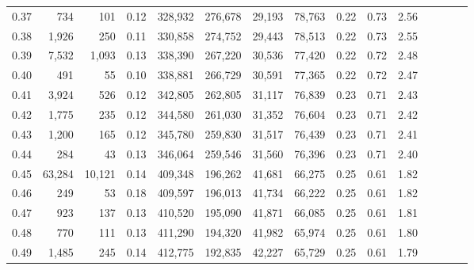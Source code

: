 \begin{tabular}{rrrcrrrrrrrrrrr}
0.37 &     734 &     101 &                                       0.12 &  328,932 &  276,678 &   29,193 &   78,763 &  0.22 &  0.73 &                         2.56 \\
0.38 &   1,926 &     250 &                                       0.11 &  330,858 &  274,752 &   29,443 &   78,513 &  0.22 &  0.73 &                         2.55 \\
0.39 &   7,532 &   1,093 &                                       0.13 &  338,390 &  267,220 &   30,536 &   77,420 &  0.22 &  0.72 &                         2.48 \\
0.40 &     491 &      55 &                                       0.10 &  338,881 &  266,729 &   30,591 &   77,365 &  0.22 &  0.72 &                         2.47 \\
0.41 &   3,924 &     526 &                                       0.12 &  342,805 &  262,805 &   31,117 &   76,839 &  0.23 &  0.71 &                         2.43 \\
0.42 &   1,775 &     235 &                                       0.12 &  344,580 &  261,030 &   31,352 &   76,604 &  0.23 &  0.71 &                         2.42 \\
0.43 &   1,200 &     165 &                                       0.12 &  345,780 &  259,830 &   31,517 &   76,439 &  0.23 &  0.71 &                         2.41 \\
0.44 &     284 &      43 &                                       0.13 &  346,064 &  259,546 &   31,560 &   76,396 &  0.23 &  0.71 &                         2.40 \\
0.45 &  63,284 &  10,121 &                                       0.14 &  409,348 &  196,262 &   41,681 &   66,275 &  0.25 &  0.61 &                         1.82 \\
0.46 &     249 &      53 &                                       0.18 &  409,597 &  196,013 &   41,734 &   66,222 &  0.25 &  0.61 &                         1.82 \\
0.47 &     923 &     137 &                                       0.13 &  410,520 &  195,090 &   41,871 &   66,085 &  0.25 &  0.61 &                         1.81 \\
0.48 &     770 &     111 &                                       0.13 &  411,290 &  194,320 &   41,982 &   65,974 &  0.25 &  0.61 &                         1.80 \\
0.49 &   1,485 &     245 &                                       0.14 &  412,775 &  192,835 &   42,227 &   65,729 &  0.25 &  0.61 &                         1.79 \\

\end{tabular}
